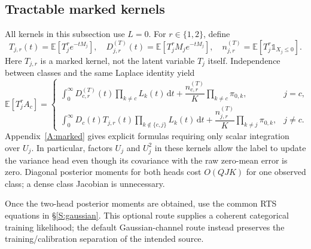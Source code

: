 \documentclass[letterpaper]{article}
\newcommand{\E}{\mathbb E}
\newcommand{\ind}{\mathbb 1}
\newcommand{\dd}{\,\mathrm d}
\begin{document}
\subsection{Tractable marked kernels}
All kernels in this subsection use $L=0$. For $r\in\{1,2\}$, define
\begin{equation}
T_{j,r}(t)=\E[T_j^r e^{-tM_j}],\quad
D_{j,r}^{(T)}(t)=\E[T_j^rM_j e^{-tM_j}],\quad
n_{j,r}^{(T)}=\E[T_j^r\ind_{X_j\le0}].
\label{E:marked}
\end{equation}
Here $T_{j,r}$ is a marked kernel, not the latent variable $T_j$ itself. Independence between classes and the same Laplace identity yield
\begin{equation}
\E[T_j^rA_c]=
\begin{cases}
\displaystyle\int_0^\infty D_{c,r}^{(T)}(t)\prod_{k\ne c}L_k(t)\dd t
+\dfrac{n_{c,r}^{(T)}}K\prod_{k\ne c}\pi_{0,k},&j=c,\\[.9em]
\displaystyle\int_0^\infty D_c(t)T_{j,r}(t)\prod_{k\notin\{c,j\}}L_k(t)\dd t
+\dfrac{n_{j,r}^{(T)}}K\prod_{k\ne j}\pi_{0,k},&j\ne c.
\end{cases}
\label{E:markedtilt}
\end{equation}
Appendix~\ref{A:marked} gives explicit formulas requiring only scalar integration over $U_j$. In particular, factors $U_j$ and $U_j^2$ in these kernels allow the label to update the variance head even though its covariance with the raw zero-mean error is zero. Diagonal posterior moments for both heads cost $O(QJK)$ for one observed class; a dense class Jacobian is unnecessary.


Once the two-head posterior moments are obtained, use the common RTS equations in \S\ref{S:gaussian}. This optional route supplies a coherent categorical training likelihood; the default Gaussian-channel route instead preserves the training/calibration separation of the intended source.
\end{document}
